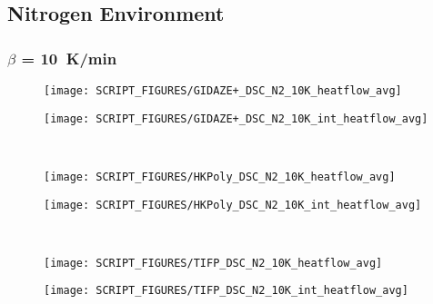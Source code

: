 \subsection{Nitrogen Environment}
\label{DSC_N2}
\subsubsection{$\beta$ = 10~K/min}
\begin{minipage}{0.5\textwidth}
\begin{figure}[H]
{\texttt{[image: SCRIPT\_FIGURES/GIDAZE+\_DSC\_N2\_10K\_heatflow\_avg]}}\\
\end{figure}
\end{minipage}
\begin{minipage}{0.35\textwidth}
\begin{figure}[H]
{\texttt{[image: SCRIPT\_FIGURES/GIDAZE+\_DSC\_N2\_10K\_int\_heatflow\_avg]}}\\
\end{figure}
\end{minipage}\\
\begin{minipage}{0.5\textwidth}
\begin{figure}[H]
{\texttt{[image: SCRIPT\_FIGURES/HKPoly\_DSC\_N2\_10K\_heatflow\_avg]}}\\
\end{figure}
\end{minipage}
\begin{minipage}{0.35\textwidth}
\begin{figure}[H]
{\texttt{[image: SCRIPT\_FIGURES/HKPoly\_DSC\_N2\_10K\_int\_heatflow\_avg]}}\\
\end{figure}
\end{minipage}\\
\begin{minipage}{0.5\textwidth}
\begin{figure}[H]
{\texttt{[image: SCRIPT\_FIGURES/TIFP\_DSC\_N2\_10K\_heatflow\_avg]}}\\
\end{figure}
\end{minipage}
\begin{minipage}{0.35\textwidth}
\begin{figure}[H]
{\texttt{[image: SCRIPT\_FIGURES/TIFP\_DSC\_N2\_10K\_int\_heatflow\_avg]}}\\
\end{figure}
\end{minipage}\\
